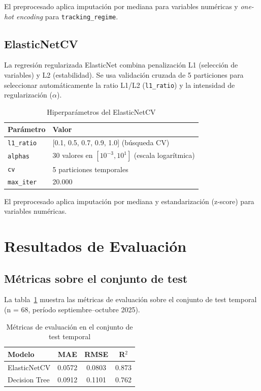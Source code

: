 \documentclass[12pt,a4paper]{article}
\begin{document}
El preprocesado aplica imputación por mediana para variables numéricas y
\textit{one-hot encoding} para \texttt{tracking\_regime}.

\subsection{ElasticNetCV}

La regresión regularizada ElasticNet combina penalización L1 (selección de variables)
y L2 (estabilidad). Se usa validación cruzada de 5 particiones para seleccionar
automáticamente la ratio L1/L2 (\texttt{l1\_ratio}) y la intensidad de regularización
($\alpha$).

\begin{table}[H]
\centering
\caption{Hiperparámetros del ElasticNetCV}
\begin{tabular}{ll}
\toprule
\textbf{Parámetro} & \textbf{Valor} \\
\midrule
\texttt{l1\_ratio}   & [0.1, 0.5, 0.7, 0.9, 1.0] (búsqueda CV) \\
\texttt{alphas}      & 30 valores en $[10^{-3}, 10^{1}]$ (escala logarítmica) \\
\texttt{cv}          & 5 particiones temporales \\
\texttt{max\_iter}   & 20.000 \\
\bottomrule
\end{tabular}
\end{table}

El preprocesado aplica imputación por mediana y estandarización (z-score) para
variables numéricas.

\newpage
\section{Resultados de Evaluación}

\subsection{Métricas sobre el conjunto de test}

La tabla~\ref{tab:metricas} muestra las métricas de evaluación sobre el conjunto de
test temporal (n = 68, período septiembre--octubre 2025).

\begin{table}[H]
\centering
\caption{Métricas de evaluación en el conjunto de test temporal}
\label{tab:metricas}
\begin{tabular}{lccc}
\toprule
\textbf{Modelo} & \textbf{MAE} & \textbf{RMSE} & \textbf{R$^2$} \\
\midrule
ElasticNetCV       & 0.0572 & 0.0803 & 0.873 \\
Decision Tree      & 0.0912 & 0.1101 & 0.762 \\
\bottomrule
\end{tabular}
\end{table}
\end{document}
